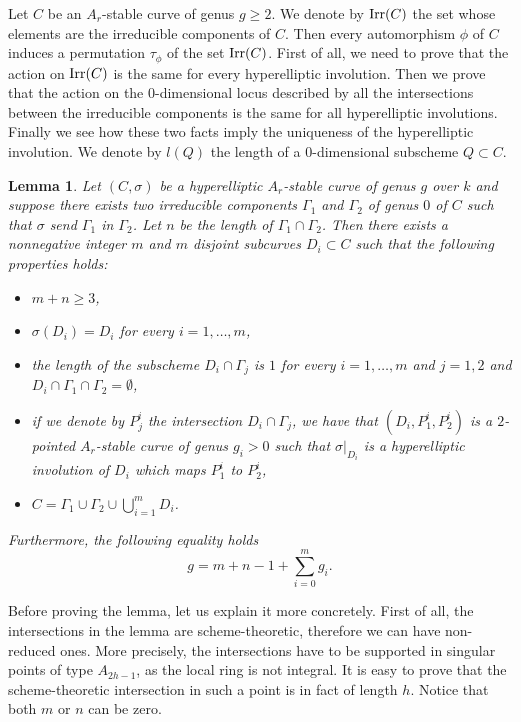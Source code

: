 \documentclass{alggeom}
\numberwithin{equation}{section}
\numberwithin{subsection}{section}
\newtheorem{lemma}[theorem]{Lemma}
\theoremstyle{definition}
\theoremstyle{remark}
\begin{document}
Let $C$ be an $A_r$-stable curve of genus $g\geq 2$. We denote by ${\rm Irr}(C)$ the set whose elements are the irreducible components of $C$. Then every automorphism $\phi$ of $C$ induces a permutation $\tau_{\phi}$ of the set ${\rm Irr}(C)$. First of all, we need to prove that the action on ${\rm Irr}(C)$ is the same for every hyperelliptic involution. Then we prove that the action on the $0$-dimensional locus described by all the intersections between the irreducible components is the same for all hyperelliptic involutions. Finally we see how these two facts imply the uniqueness of the hyperelliptic involution. We denote by $l(Q)$ the length of a $0$-dimensional subscheme $Q\subset C$.

\begin{lemma}\label{lem:exist-decomposition}
	Let $(C,\sigma)$ be a hyperelliptic $A_r$-stable curve of genus $g$ over $k$ and suppose there exists two irreducible components $\Gamma_1$ and $\Gamma_2$  of genus $0$ of $C$ such that $\sigma$ send $\Gamma_1$ in $\Gamma_2$. Let $n$ be the length of $\Gamma_1\cap \Gamma_2$. Then there exists a nonnegative integer $m$ and $m$ disjoint subcurves $D_i \subset C$ such that the following properties holds:
	\begin{itemize}
		\item[a)] $m+n\geq 3$,
		\item[b)] $\sigma(D_i)=D_i$ for every $i=1,\dots,m$,
		\item[c)] the length of the subscheme $D_i\cap \Gamma_j$ is $1$ for every $i=1,\dots,m$ and $j=1,2$ and $D_i \cap \Gamma_1 \cap \Gamma_2=\emptyset$,
		\item[d)] if we denote by $P_j^i$ the intersection $D_i \cap \Gamma_j$, we have that $(D_i,P_1^i,P_2^i)$ is a $2$-pointed $A_r$-stable curve of genus $g_i>0$ such that $\sigma\vert_{D_i}$ is a hyperelliptic involution of $D_i$ which maps $P_1^i$ to $P_2^i$,
		\item[e)] $C=\Gamma_1\cup \Gamma_2 \cup \bigcup_{i=1}^m D_i$.
	\end{itemize}
Furthermore, the following equality holds $$g=m+n-1+\sum_{i=0}^m g_i. $$
\end{lemma}

Before proving the lemma, let us explain it more concretely. First of all, the intersections in the lemma are scheme-theoretic, therefore we can have non-reduced ones. More precisely, the intersections have to be supported in singular points of type $A_{2h-1}$, as the local ring is not integral. It is easy to prove that the scheme-theoretic intersection in such a point is in fact of length $h$. Notice that both $m$ or $n$ can be zero.
\end{document}

